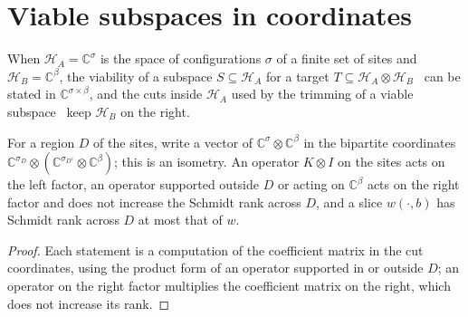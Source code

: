 \section{Viable subspaces in coordinates}

When $\mathcal H_A=\mathbb C^\sigma$ is the space of configurations
$\sigma$ of a finite set of sites and $\mathcal H_B=\mathbb C^\beta$, the
viability of a subspace $S\subseteq\mathcal H_A$ for a target
$T\subseteq\mathcal H_A\otimes\mathcal H_B$~\cite[lines
    433--440]{Arad2016RigorousRG} can be stated in $\mathbb C^{\sigma\times\beta}$,
and the cuts inside $\mathcal H_A$ used by the trimming of a viable
subspace~\cite[lines 660--697]{Arad2016RigorousRG} keep $\mathcal H_B$ on the
right.

\begin{theorem}
    \label{thm:cut_environment_coordinates}
    \leanok
    For a region $D$ of the sites, write a vector of
    $\mathbb C^\sigma\otimes\mathbb C^\beta$ in the bipartite coordinates
    $\mathbb C^{\sigma_D}\otimes(\mathbb C^{\sigma_{D^{\mathrm c}}}\otimes
        \mathbb C^\beta)$; this is an isometry. An operator $K\otimes I$ on the
    sites acts on the left factor, an operator supported outside $D$ or
    acting on $\mathbb C^\beta$ acts on the right factor and does not
    increase the Schmidt rank across $D$, and a slice $w(\cdot,b)$ has
    Schmidt rank across $D$ at most that of $w$.
\end{theorem}

\begin{proof}
    \leanok
    Each statement is a computation of the coefficient matrix in the cut
    coordinates, using the product form of an operator supported in or
    outside $D$; an operator on the right factor multiplies the coefficient
    matrix on the right, which does not increase its rank.
\end{proof}

